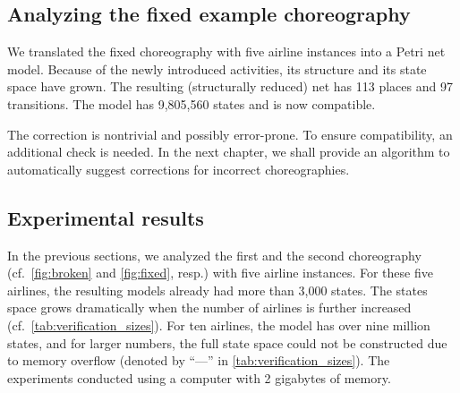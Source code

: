 \subsection*{Analyzing the fixed example choreography}

We translated the fixed choreography with five airline instances into a Petri net model. Because of the newly introduced activities, its structure and its state space have grown. The resulting (structurally reduced) net has 113 places and 97 transitions. The model has 9{,}805{,}560 states and is now compatible.

\medskip

The correction is nontrivial and possibly error-prone. To ensure compatibility, an additional check is needed. In the next chapter, we shall provide an algorithm to automatically suggest corrections for incorrect choreographies.



\subsection*{Experimental results}

In the previous sections, we analyzed the first and the second choreography (cf.~\autoref{fig:broken} and \autoref{fig:fixed}, resp.) with five airline instances. For these five airlines, the resulting models already had more than 3{,}000 states. The states space grows dramatically when the number of airlines is further increased (cf.~\autoref{tab:verification_sizes}). For ten airlines, the model has over nine million states, and for larger numbers, the full state space could not be constructed due to memory overflow (denoted by ``---'' in \autoref{tab:verification_sizes}). The experiments conducted using a computer with 2 gigabytes of memory.

